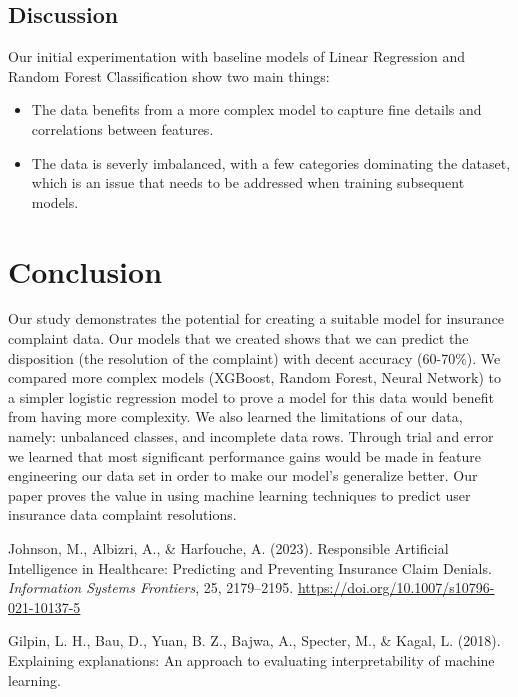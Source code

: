 \documentclass[final]{article}
\begin{document}
\subsection{Discussion}
Our initial experimentation with baseline models of Linear Regression and Random Forest Classification show two main things:
\begin{itemize}
  \item The data benefits from a more complex model to capture fine details and correlations between features.
  \item The data is severly imbalanced, with a few categories dominating the dataset, which is an issue that needs to be addressed when training subsequent models.
\end{itemize} 

\section{Conclusion}
Our study demonstrates the potential for creating a suitable model for insurance complaint data. Our models that we created shows that we can predict the disposition (the resolution of the complaint) with decent accuracy (60-70\%). We compared more complex models (XGBoost, Random Forest, Neural Network) to a simpler logistic regression model to prove a model for this data would benefit from having more complexity. We also learned the limitations of our data, namely: unbalanced classes, and incomplete data rows. Through trial and error we learned that most significant performance gains would be made in feature engineering our data set in order to make our model’s generalize better. Our paper proves the value in using machine learning techniques to predict user insurance data complaint resolutions. 




\begin{thebibliography}{9}

Johnson, M., Albizri, A., \& Harfouche, A. (2023).
Responsible Artificial Intelligence in Healthcare: Predicting and Preventing Insurance Claim Denials.
\textit{Information Systems Frontiers}, 25, 2179–2195. \url{https://doi.org/10.1007/s10796-021-10137-5}

Gilpin, L. H., Bau, D., Yuan, B. Z., Bajwa, A., Specter, M., \& Kagal, L. (2018).
Explaining explanations: An approach to evaluating interpretability of machine learning.

\end{thebibliography}
\end{document}
